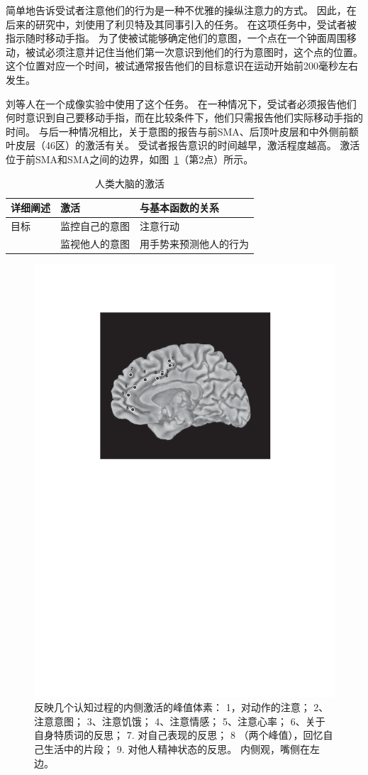 简单地告诉受试者注意他们的行为是一种不优雅的操纵注意力的方式。
因此，在后来的研究中，刘\cite{lau2004willed}使用了利贝特及其同事\cite{libet1993time}引入的任务。
在这项任务中，受试者被指示随时移动手指。
为了使被试能够确定他们的意图，一个点在一个钟面周围移动，被试必须注意并记住当他们第一次意识到他们的行为意图时，这个点的位置。
这个位置对应一个时间，被试通常报告他们的目标意识在运动开始前200毫秒左右发生。
\par


刘等人\cite{lau2004willed}在一个成像实验中使用了这个任务。
在一种情况下，受试者必须报告他们何时意识到自己要移动手指，而在比较条件下，他们只需报告他们实际移动手指的时间。
与后一种情况相比，关于意图的报告与前SMA、后顶叶皮层和中外侧前额叶皮层（46区）的激活有关。
受试者报告意识的时间越早，激活程度越高\cite{lau2006measuring}。
激活位于前SMA和SMA之间的边界，如图~\ref{fig:fig_9_7}（第2点）所示。
\par


\begin{table}[htbp] 
	\newcommand{\tabincell}[2]{\begin{tabular}{@{}#1@{}}#2\end{tabular}} %
	\centering
	\caption{人类大脑的激活\label{tab:9_4}}
	\renewcommand\arraystretch{1.5}	%
	\begin{tabular}{lll}
		\toprule
		详细阐述 & 激活 & 与基本函数的关系\\
		\midrule
		目标 & 监控自己的意图 & 注意行动  \\
		& 监视他人的意图 & 用手势来预测他人的行为 \\
		\bottomrule
		
	\end{tabular}%
\end{table}%


\begin{figure}[!htb]
	\centering
	\includegraphics[width=0.5\linewidth]{chap9/9_7}
	\caption{反映几个认知过程的内侧激活的峰值体素：
		1，对动作的注意；
		2、注意意图；
		3、注意饥饿；
		4、注意情感；
		5、注意心率；
		6、关于自身特质词的反思；
		7. 对自己表现的反思；
		8 （两个峰值），回忆自己生活中的片段；
		9. 对他人精神状态的反思。
		内侧观，嘴侧在左边。\label{fig:fig_9_7}}
\end{figure}
\par


